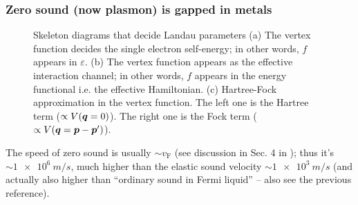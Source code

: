 \documentclass[hyperref, a4paper]{article}
\begin{document}
\subsubsection{Zero sound (now plasmon) is gapped in metals}

\begin{figure}
    \centering
    
    \caption{Skeleton diagrams that decide Landau parameters 
    (a) The vertex function decides the single electron self-energy; 
    in other words, $f$ appears in $\varepsilon$.
    (b) The vertex function appears as the effective interaction channel; 
    in other words, $f$ appears in the energy functional i.e. the effective Hamiltonian.
    (c) Hartree-Fock approximation in the vertex function.
    The left one is the Hartree term ($\propto V(\vb*{q} = 0)$).
    The right one is the Fock term ($\propto V(\vb*{q} = \vb*{p} - \vb*{p}')$).}
    \label{fig:hf-vertex}
\end{figure}

The speed of zero sound is usually $\sim v_{\text{F}}$
(see discussion in Sec. 4 in \cite{lifshitz2013statistical});
thus it's $\sim \SI{1e6}{m/s}$, 
much higher than the elastic sound velocity $\sim \SI{1e3}{m/s}$
(and actually also higher than ``ordinary sound in Fermi liquid'' 
-- also see the previous reference).
\end{document}
